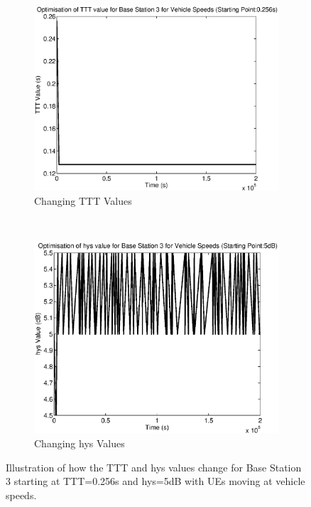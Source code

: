 \begin{figure}[H]
        \centering
        \begin{subfigure}[b]{0.49\textwidth}
                \includegraphics[width=\textwidth]{figures/graphs/vehmid/TTT3.eps}
                \caption{Changing TTT Values}
        \end{subfigure}%
        ~ %
        \begin{subfigure}[b]{0.49\textwidth}
                \includegraphics[width=\textwidth]{figures/graphs/vehmid/hys3.eps}
                \caption{Changing hys Values}
        \end{subfigure}
        \caption{Illustration of how the TTT and hys values change for Base Station 3 starting at TTT=0.256s and hys=5dB with UEs moving at vehicle speeds.}
\end{figure}
